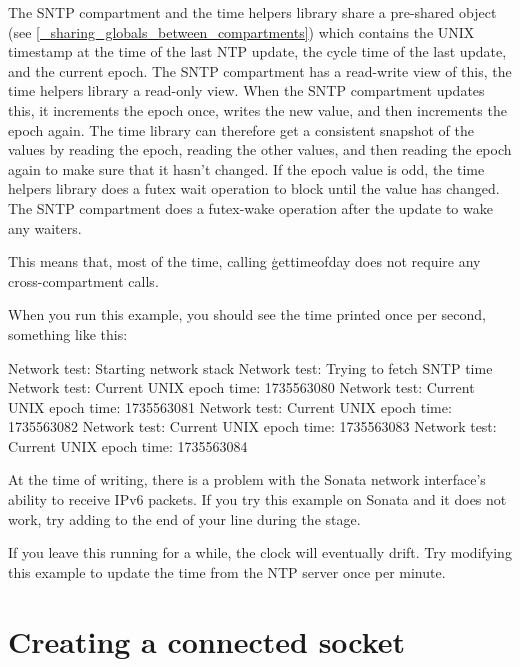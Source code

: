 \codelisting[filename=examples/sntp/sntp.cc,marker=show_time,label=lst:sntpshowtime,caption="Printing the current UNIX epoch time."]{}

The SNTP compartment and the time helpers library share a pre-shared object (see \ref{_sharing_globals_between_compartments}) which contains the UNIX timestamp at the time of the last NTP update, the cycle time of the last update, and the current epoch.
The SNTP compartment has a read-write view of this, the time helpers library a read-only view.
When the SNTP compartment updates this, it increments the epoch once, writes the new value, and then increments the epoch again.
The time library can therefore get a consistent snapshot of the values by reading the epoch, reading the other values, and then reading the epoch again to make sure that it hasn't changed.
If the epoch value is odd, the time helpers library does a futex wait operation to block until the value has changed.
The SNTP compartment does a futex-wake operation after the update to wake any waiters.

This means that, most of the time, calling \c{gettimeofday} does not require any cross-compartment calls.

When you run this example, you should see the time printed once per second, something like this:

\begin{console}
Network test: Starting network stack
Network test: Trying to fetch SNTP time
Network test: Current UNIX epoch time: 1735563080
Network test: Current UNIX epoch time: 1735563081
Network test: Current UNIX epoch time: 1735563082
Network test: Current UNIX epoch time: 1735563083
Network test: Current UNIX epoch time: 1735563084
\end{console}

\begin{note}
At the time of writing, there is a problem with the Sonata network interface's ability to receive IPv6 packets.
If you try this example on Sonata and it does not work, try adding  to the end of your  line during the  stage.
\end{note}

If you leave this running for a while, the clock will eventually drift.
Try modifying this example to update the time from the NTP server once per minute.

\section{Creating a connected socket}

